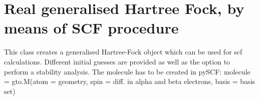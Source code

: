 \documentclass[letterpaper,10pt,english]{sphinxmanual}
\begin{document}
\label{\detokenize{Real_GHF:module-ghf.real_GHF}}

\chapter{Real generalised Hartree Fock, by means of SCF procedure}
\label{\detokenize{Real_GHF:real-generalised-hartree-fock-by-means-of-scf-procedure}}\label{\detokenize{Real_GHF::doc}}
This class creates a generalised Hartree-Fock object which can be used for scf calculations. Different initial guesses
are provided as well as the option to perform a stability analysis.
The molecule has to be created in pySCF:
molecule = gto.M(atom = geometry, spin = diff. in alpha and beta electrons, basis = basis set)
\end{document}
